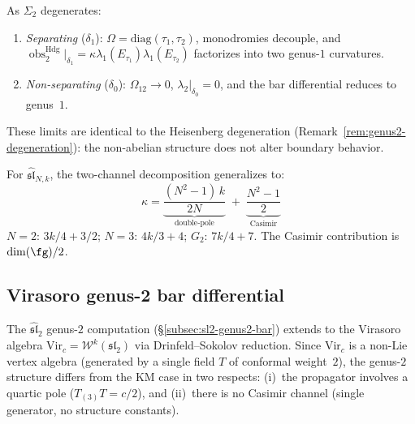 \begin{remark}\label{rem:sl2-genus2-degeneration}
As $\Sigma_2$ degenerates:
\begin{enumerate}
\item \emph{Separating} ($\delta_1$): $\Omega = \mathrm{diag}(\tau_1, \tau_2)$, monodromies decouple, and
$\operatorname{obs}^{\mathrm{Hdg}}_2|_{\delta_1}
=\kappa\lambda_1(E_{\tau_1})\lambda_1(E_{\tau_2})$ factorizes into
two genus-$1$ curvatures.
\item \emph{Non-separating} ($\delta_0$): $\Omega_{12} \to 0$, $\lambda_2|_{\delta_0} = 0$, and the bar differential reduces to genus~$1$.
\end{enumerate}
These limits are identical to the Heisenberg degeneration (Remark~\ref{rem:genus2-degeneration}): the non-abelian structure does not alter boundary behavior.
\end{remark}

\begin{remark}\label{rem:genus2-higher-rank}
For $\widehat{\mathfrak{sl}}_{N,k}$, the two-channel decomposition generalizes to:
\begin{equation}\label{eq:slN-kappa-decomp-genus2}
\kappa = \underbrace{\frac{(N^2-1)\,k}{2N}}_{\text{double-pole}}
\;+\; \underbrace{\frac{N^2-1}{2}}_{\text{Casimir}}
\end{equation}
$N=2$: $3k/4 + 3/2$; $N=3$: $4k/3 + 4$; $G_2$: $7k/4 + 7$. The Casimir contribution is $\dim(\fg)/2$.
\end{remark}

\subsection{Virasoro genus-2 bar differential}\label{subsec:virasoro-genus2-bar}

The $\widehat{\mathfrak{sl}}_2$ genus-$2$ computation
(\S\ref{subsec:sl2-genus2-bar}) extends to the Virasoro algebra
$\mathrm{Vir}_c = \mathcal{W}^k(\mathfrak{sl}_2)$ via
Drinfeld--Sokolov reduction. Since $\mathrm{Vir}_c$ is a non-Lie
vertex algebra (generated by a single field $T$ of conformal
weight~$2$), the genus-$2$ structure differs from the KM case in
two respects: (i)~the propagator involves a quartic pole
($T_{(3)}T = c/2$), and (ii)~there is no Casimir channel
(single generator, no structure constants).

